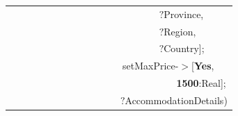 \documentclass[a4paper,9pt]{beamer}
\begin{document}
{\begin{table} [tbph]
\begin{tabular}{|l|l|l|}
  &                    &$~~~~~~~~~~~~~~~~~~~~~~~~~~~~~~~~~~~~~~~~~~~~~~~~~~~~~~~~~~~~?$Province,  \\
  &                    &$~~~~~~~~~~~~~~~~~~~~~~~~~~~~~~~~~~~~~~~~~~~~~~~~~~~~~~~~~~~~?$Region, \\
  &                    &$~~~~~~~~~~~~~~~~~~~~~~~~~~~~~~~~~~~~~~~~~~~~~~~~~~~~~~~~~~~~?$Country]; \\ 
  &                    &$~~~~~~~~~~~~~~~~~~~~~~~~~~~~~~~~~~~~~~~~~~~$setMaxPrice-$>$[\textbf{{\color{blue}Yes}},\\
  &              &$~~~~~~~~~~~~~~~~~~~~~~~~~~~~~~~~~~~~~~~~~~~~~~~~~~~~~~~~~~~~~~~~~~~~$\textbf{{\color{blue}1500}}:Real]; \\ 
  &                    &$~~~~~~~~~~~~~~~~~~~~~~~~~~~~~~~~~~~~~~~~~~${\color{red}$?$AccommodationDetails})\\
\hline
 \end{tabular} 
\end{table}}
\end{document}
